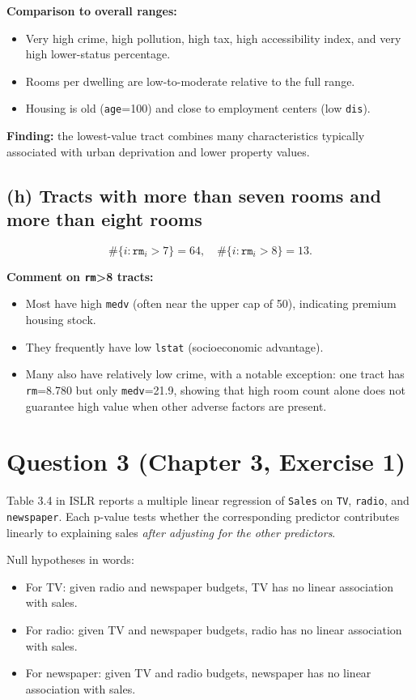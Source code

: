 \documentclass[12pt]{article}
\begin{document}
\textbf{Comparison to overall ranges:}
\begin{itemize}
\item Very high crime, high pollution, high tax, high accessibility index, and very high lower-status percentage.
\item Rooms per dwelling are low-to-moderate relative to the full range.
\item Housing is old (\texttt{age}=100) and close to employment centers (low \texttt{dis}).
\end{itemize}

\textbf{Finding:} the lowest-value tract combines many characteristics typically associated with urban deprivation and lower property values.

\subsection*{(h) Tracts with more than seven rooms and more than eight rooms}
\[
\#\{i: \texttt{rm}_i > 7\} = 64, \quad \#\{i: \texttt{rm}_i > 8\} = 13.
\]

\textbf{Comment on \texttt{rm}>8 tracts:}
\begin{itemize}
\item Most have high \texttt{medv} (often near the upper cap of 50), indicating premium housing stock.
\item They frequently have low \texttt{lstat} (socioeconomic advantage).
\item Many also have relatively low crime, with a notable exception: one tract has \texttt{rm}=8.780 but only \texttt{medv}=21.9, showing that high room count alone does not guarantee high value when other adverse factors are present.
\end{itemize}

\section*{Question 3 (Chapter 3, Exercise 1)}
Table 3.4 in ISLR reports a multiple linear regression of \texttt{Sales} on \texttt{TV}, \texttt{radio}, and \texttt{newspaper}. Each p-value tests whether the corresponding predictor contributes linearly to explaining sales \emph{after adjusting for the other predictors}.

Null hypotheses in words:
\begin{itemize}
\item For TV: given radio and newspaper budgets, TV has no linear association with sales.
\item For radio: given TV and newspaper budgets, radio has no linear association with sales.
\item For newspaper: given TV and radio budgets, newspaper has no linear association with sales.
\end{itemize}
\end{document}
